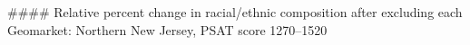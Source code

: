 #### Relative percent change in racial/ethnic composition after excluding each Geomarket: Northern New Jersey, PSAT score 1270–1520
